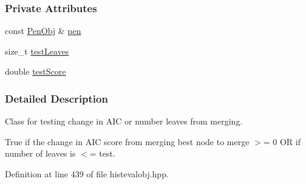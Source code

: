 \subsubsection*{\-Private \-Attributes}
\begin{DoxyCompactItemize}
\item 
const \hyperlink{classsubpavings_1_1PenObj}{\-Pen\-Obj} \& \hyperlink{classsubpavings_1_1CritAICMergeChangeOrLeaves__LTE_aa66d4c4f589e53de40c3dcb04c48d59c}{pen}
\item 
size\-\_\-t \hyperlink{classsubpavings_1_1CritAICMergeChangeOrLeaves__LTE_ab71eaee1d035924d59aae000b5b2ebcb}{test\-Leaves}
\item 
double \hyperlink{classsubpavings_1_1CritAICMergeChangeOrLeaves__LTE_ab0fd379b75370697ec1f0264adf24ca6}{test\-Score}
\end{DoxyCompactItemize}


\subsubsection{\-Detailed \-Description}
\-Class for testing change in \-A\-I\-C or number leaves from merging. 

\-True if the change in \-A\-I\-C score from merging best node to merge $>$= 0 \-O\-R if number of leaves is $<$= test. 

\-Definition at line 439 of file histevalobj.\-hpp.



